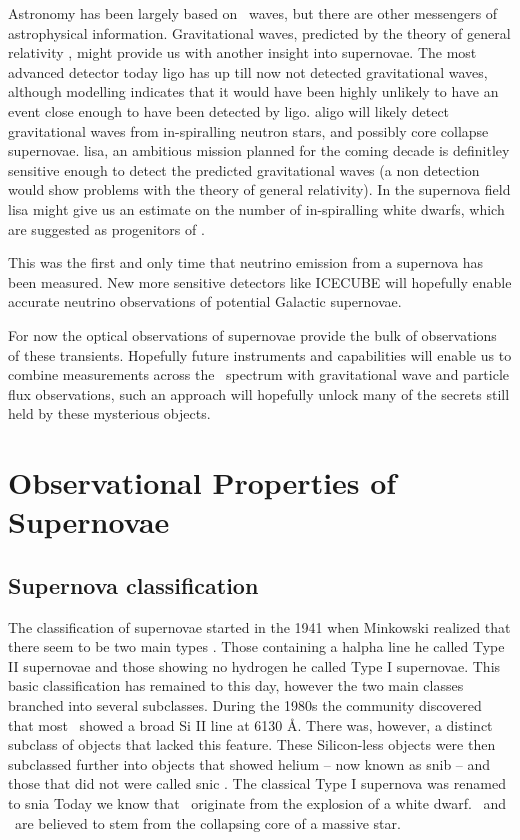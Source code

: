 Astronomy has been largely based on \EM\ waves, but there are other messengers of astrophysical information. Gravitational waves, predicted by the theory of general relativity  \citep{1918SPAW.......154E}, might provide us with another insight into supernovae. The most advanced detector today \gls{ligo} has up till now not detected gravitational waves, although modelling indicates that it would have been highly unlikely to have an event close enough to have been detected by \gls{ligo}. \gls{aligo} will likely detect gravitational waves from in-spiralling neutron stars, and possibly core collapse supernovae. \gls{lisa}, an ambitious mission planned for the coming decade is definitley sensitive enough to detect the predicted gravitational waves (a non detection would show problems with the theory of general relativity). In the supernova field \gls{lisa} might give us an estimate on the number of in-spiralling white dwarfs, which are suggested as progenitors of \sneia.

 This was the first and only time that neutrino emission from a supernova has been measured\citep{1987PhRvL..58.1494B,1987PhRvL..58.1490H,Alekseev:1988gp}. New more sensitive detectors like ICECUBE \citep{2008ICRC....4..835K} will hopefully enable accurate neutrino observations of potential Galactic supernovae.

For now the optical observations of supernovae provide the bulk of observations of these transients. Hopefully future instruments and capabilities will enable us to combine measurements across the \EM\ spectrum with gravitational wave and particle flux observations, such an approach will hopefully unlock many of the secrets still held by these mysterious objects.

\section{Observational Properties of Supernovae}

\subsection{Supernova classification}
\label{sec:sn_classification}

The classification of supernovae started in the 1941 when Minkowski realized that there seem to be two main types \citep{1941PASP...53..224M}. Those containing a \gls{halpha} line he called Type II supernovae and those showing no hydrogen he called Type I supernovae. This basic classification has remained to this day, however the two main classes branched into several subclasses. During the 1980s the community discovered that most \sneia\ showed a broad Si II line at 6130 \AA. There was, however, a distinct subclass of objects that lacked this feature. These Silicon-less objects were then subclassed further into objects that showed helium -- now known as \gls{snib} --  and those that did not were called \gls{snic} \citep[see spectra in Figure \ref{fig:sn_classification};]{1987ApJ...317..355H, 1986ApJ...306L..77G}. The classical Type I supernova was renamed to \gls{snia} Today we know that \sneia\ originate from the explosion of a white dwarf. \sneii\ and \sneibc\ are believed to stem from the collapsing core of a massive star. 

